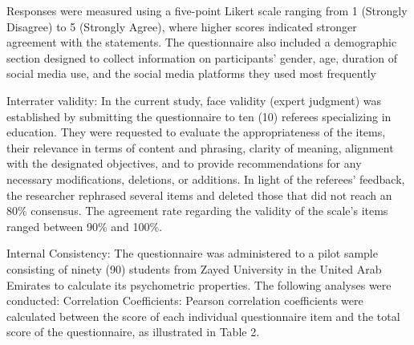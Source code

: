 \documentclass[10pt]{NSP1}
\begin{document}
Responses were measured using a five-point Likert scale ranging from 1 (Strongly Disagree) to 5 (Strongly Agree), where higher scores indicated stronger agreement with the statements. The questionnaire also included a demographic section designed to collect information on participants' gender, age, duration of social media use, and the social media platforms they used most frequently

\par\medskip{}\smallskip

Interrater validity: In the current study, face validity (expert judgment) was established by submitting the questionnaire to ten (10) referees specializing in education. They were requested to evaluate the appropriateness of the items, their relevance in terms of content and phrasing, clarity of meaning, alignment with the designated objectives, and to provide recommendations for any necessary modifications, deletions, or additions. In light of the referees’ feedback, the researcher rephrased several items and deleted those that did not reach an 80\% consensus. The agreement rate regarding the validity of the scale's items ranged between 90\% and 100\%.

Internal Consistency: The questionnaire was administered to a pilot sample consisting of ninety (90) students from Zayed University in the United Arab Emirates to calculate its psychometric properties. The following analyses were conducted: Correlation Coefficients: Pearson correlation coefficients were calculated between the score of each individual questionnaire item and the total score of the questionnaire, as illustrated in Table 2.
\end{document}
